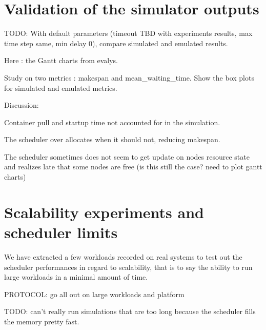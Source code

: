 \section{Validation of the simulator outputs}

TODO: With default parameters (timeout TBD with experiments results, max time step same, min delay 0), compare simulated and emulated results. 

Here : the Gantt charts from evalys.

Study on two metrics : makespan and mean\_waiting\_time. Show the box plots for
simulated and emulated metrics.

Discussion:

Container pull and startup time not accounted for in the simulation.

The scheduler over allocates when it should not, reducing makespan.

The scheduler sometimes does not seem to get update on nodes resource state and
realizes late that some nodes are free (is this still the case? need to plot
gantt charts)

\section{Scalability experiments and scheduler limits}

We have extracted a few workloads recorded on real systems to test out the
scheduler performances in regard to scalability, that is to say the ability to
run large workloads in a minimal amount of time.

PROTOCOL: go all out on large workloads and platform

TODO: can't really run simulations that are too long because the scheduler
fills the memory pretty fast.
